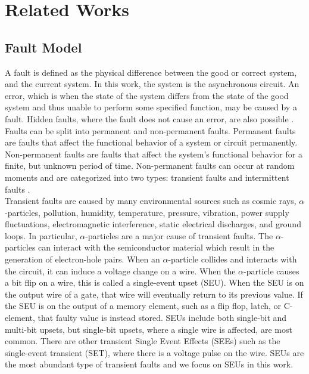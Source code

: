 \documentclass[12pt]{report}
\begin{document}
\chapter{Related Works}
\section{Fault Model}
A fault is defined as the physical difference between the good or correct system, and the current system.  In this work, the system is the asynchronous circuit.  An error, which is when the state of the system differs from the state of the good system and thus unable to perform some specified function, may be caused by a fault.  Hidden faults, where the fault does not cause an error, are also possible \cite{jha_gupta_2003}. \\

Faults can be split into permanent and non-permanent faults. Permanent faults are faults that affect the functional behavior of a system or circuit permanently.  Non-permanent faults are faults that affect the system's functional behavior for a finite, but unknown period of time.  Non-permanent faults can occur at random moments and are categorized into two types:  transient faults and intermittent faults \cite{jha_gupta_2003}.\\ %

Transient faults are caused by many environmental sources such as cosmic rays, $\alpha$-particles, pollution, humidity, temperature, pressure, vibration, power supply fluctuations, electromagnetic interference, static electrical discharges, and ground loops. In particular, $\alpha$-particles are a major cause of transient faults.  The $\alpha$-particles can interact with the semiconductor material which result in the generation of electron-hole pairs.  When an $\alpha$-particle collides and interacts with the circuit, it can induce a voltage change on a wire.  When the $\alpha$-particle causes a bit flip on a wire, this is called a single-event upset (SEU).  When the SEU is on the output wire of a gate, that wire will eventually return to its previous value.  If the SEU is on the output of a memory element, such as a flip flop, latch, or C-element, that faulty value is instead stored.  SEUs include both single-bit and multi-bit upsets, but single-bit upsets, where a single wire is affected, are most common.  There are other transient Single Event Effects (SEEs) such as the single-event transient (SET), where there is a voltage pulse on the wire.  SEUs are the most abundant type of transient faults and we focus on SEUs in this work.  \cite{jha_gupta_2003}\\
\end{document}
